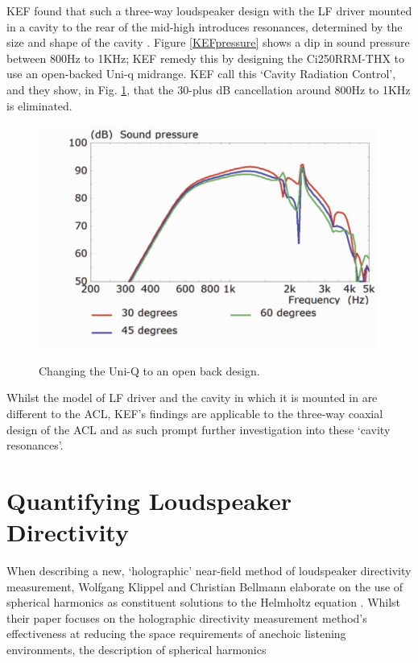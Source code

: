 \documentclass{report}
\begin{document}
        KEF found that such a three-way loudspeaker design with the LF driver mounted in a cavity to the rear of the mid-high introduces resonances, determined by the size and shape of the cavity \cite{KEFCi}.
        Figure \ref{KEFpressure} shows a dip in sound pressure between 800Hz to 1KHz; KEF remedy this by designing the Ci250RRM-THX to use an open-backed Uni-q midrange.
        KEF call this `Cavity Radiation Control', and they show, in Fig. \ref{KEFopenback}, that the 30-plus dB cancellation around 800Hz to 1KHz is eliminated.
        \begin{figure}[H]
            \centering
            \includegraphics[scale=0.5]{figs/KEFopenback.png}
            \caption{Changing the Uni-Q to an open back design.}\cite{KEFCi}
            \label{KEFopenback}
        \end{figure}
        Whilst the model of LF driver and the cavity in which it is mounted in are different to the ACL, KEF's findings are applicable to the three-way coaxial design of the ACL and as such prompt further investigation into these `cavity resonances'.



    \section{Quantifying Loudspeaker Directivity} 
        When describing a new, `holographic' near-field method of loudspeaker directivity measurement, Wolfgang Klippel and Christian Bellmann elaborate on the use of spherical harmonics as constituent solutions to the Helmholtz equation \cite{klippel2016holographic}.
        Whilst their paper focuses on the holographic directivity measurement method's effectiveness at reducing the space requirements of anechoic listening environments, the description of spherical harmonics
        
\end{document}
